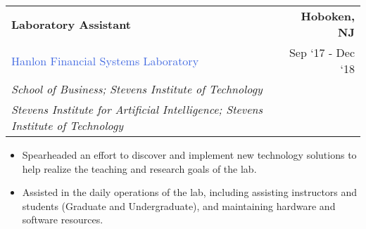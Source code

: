 \documentclass[10pt]{article}
\newcommand{\highlightcolor}{RoyalBlue}
\newcommand{\tabularxwidth}{\textwidth}
\begin{document}
    \begin{minipage}{\tabularxwidth}

        \begin{tabularx}{\tabularxwidth}{X r}
            \textbf{Laboratory Assistant} & \textbf{Hoboken, 
        NJ} \\
            \textcolor{\highlightcolor}{Hanlon Financial Systems Laboratory} & 
        
    Sep ‘17 - 
    Dec ‘18 \\
            
                
                    \textit{School of Business; Stevens Institute of Technology} & \\
                
                    \textit{Stevens Institute for Artificial Intelligence; Stevens Institute of Technology} & \\
                
            
            
        \end{tabularx}

        \begin{itemize}[noitemsep, topsep=3pt, parsep=0pt, partopsep=0pt]
            
                \item 
    Spearheaded an effort to discover and implement new technology solutions to help realize the teaching and research goals of the lab.
            
                \item 
    Assisted in the daily operations of the lab, including assisting instructors and students (Graduate and Undergraduate), and maintaining hardware and software resources.
            
        \end{itemize}

        
            \vspace{.5em}
        

    \end{minipage}
    
\end{document}
